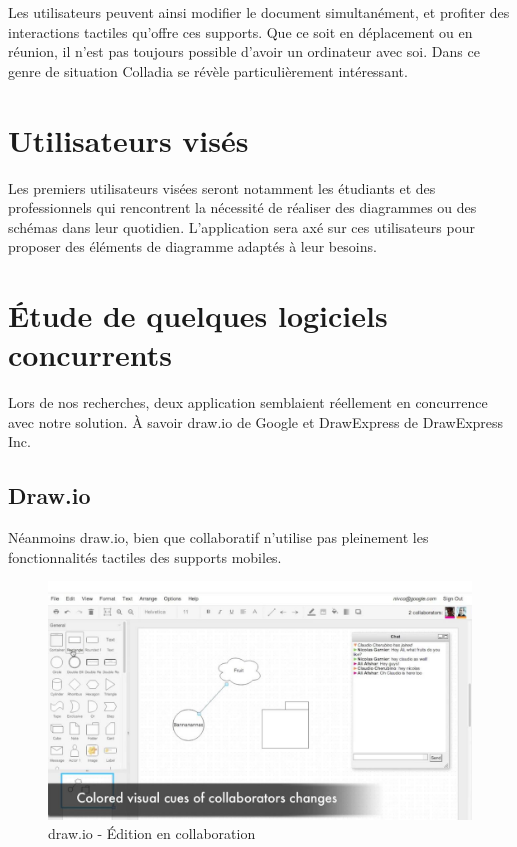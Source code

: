 \documentclass[a4paper,11pt]{article}
\begin{document}
Les utilisateurs peuvent ainsi modifier le document simultanément, et profiter des interactions tactiles qu'offre ces supports.
Que ce soit en déplacement ou en réunion, il n'est pas toujours possible d'avoir un ordinateur avec soi. Dans ce genre de situation Colladia se révèle particulièrement intéressant.
 

\section{Utilisateurs visés}
Les premiers utilisateurs visées seront notamment les étudiants et des professionnels qui rencontrent la nécessité de réaliser des diagrammes ou des schémas dans leur quotidien.
L'application sera axé sur ces utilisateurs pour proposer des éléments de diagramme adaptés à leur besoins.







\newpage
\section{Étude de quelques logiciels concurrents}
Lors de nos recherches, deux application semblaient réellement en concurrence avec notre solution. À savoir draw.io de Google et DrawExpress de DrawExpress Inc.



\subsection{Draw.io}
Néanmoins draw.io, bien que collaboratif n'utilise pas pleinement les fonctionnalités tactiles des supports mobiles.

\begin{figure}[h]
	\centering
	\includegraphics[width=\textwidth]{img/drawio}
	\caption{draw.io - Édition en collaboration}
\end{figure}
\end{document}
